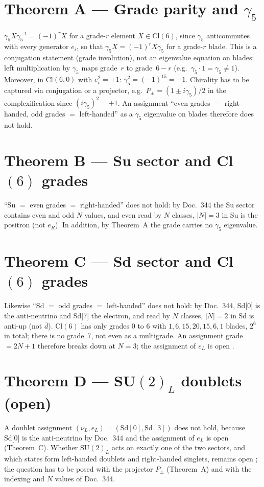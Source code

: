 \section{Theorem A --- Grade parity and $\gamma_5$ \BM}
$\gamma_5 X\gamma_5^{-1}=(-1)^r X$ for a grade-$r$ element $X\in\mathrm{Cl}(6)$, since $\gamma_5$ anticommutes with every generator $e_i$, so that $\gamma_5 X=(-1)^r X\gamma_5$ for a grade-$r$ blade. \KM
This is a conjugation statement (grade involution), not an eigenvalue equation on blades: left multiplication by $\gamma_5$ maps grade~$r$ to grade~$6-r$ (e.g.\ $\gamma_5\cdot 1=\gamma_5\neq 1$). Moreover, in Cl$(6,0)$ with $e_i^2=+1$: $\gamma_5^2=(-1)^{15}=-1$. Chirality has to be captured via conjugation or a projector, e.g.\ $P_\pm=(1\pm i\gamma_5)/2$ in the complexification since $(i\gamma_5)^2=+1$. An assignment ``even grades $=$ right-handed, odd grades $=$ left-handed'' as a $\gamma_5$ eigenvalue on blades therefore does not hold.
\section{Theorem B --- Su sector and Cl$(6)$ grades}
``Su $=$ even grades $=$ right-handed'' does not hold: by Doc.~344 the Su sector contains even and odd $N$ values, and even read by $N$ classes, $|N|=3$ in Su is the positron (not $e_R$). In addition, by Theorem~A the grade carries no $\gamma_5$ eigenvalue.
\section{Theorem C --- Sd sector and Cl$(6)$ grades}
Likewise ``Sd $=$ odd grades $=$ left-handed'' does not hold: by Doc.~344, Sd[0] is the anti-neutrino and Sd[7] the electron, and read by $N$ classes, $|N|=2$ in Sd is anti-up (not $\bar d$). Cl$(6)$ has only grades 0 to 6 with $1,6,15,20,15,6,1$ blades, $2^6$ in total; there is no grade~7, not even as a multigrade. An assignment grade $=2N+1$ therefore breaks down at $N=3$; the assignment of $e_L$ is open \SM.
\section{Theorem D --- SU$(2)_L$ doublets (open)}
A doublet assignment $(\nu_L,e_L)=(\mathrm{Sd}[0],\mathrm{Sd}[3])$ does not hold, because Sd[0] is the anti-neutrino by Doc.~344 and the assignment of $e_L$ is open (Theorem~C). Whether SU$(2)_L$ acts on exactly one of the two sectors, and which states form left-handed doublets and right-handed singlets, remains open \SM; the question has to be posed with the projector $P_\pm$ (Theorem~A) and with the indexing and $N$ values of Doc.~344.
